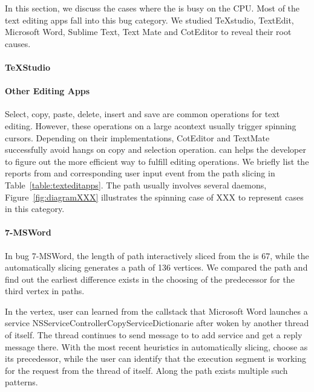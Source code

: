 In this section, we discuss the cases where the \spinningnode is busy on the
CPU. Most of the text editing apps fall into this bug category. We studied
TeXstudio, TextEdit, Microsoft Word, Sublime Text, Text Mate and CotEditor to
reveal their root causes.

\paragraph{TeXStudio}


\paragraph{Other Editing Apps}

Select, copy, paste, delete, insert and save are common operations for text
editing. However, these operations on a large acontext usually trigger spinning
cursors. Depending on their implementations, CotEditor and TextMate successfully
avoid hangs on copy and selection operation. \xxx can helps the developer to
figure out the more efficient way to fulfill editing operations. We briefly list
the reports from \spinningnode and corresponding user input event from the path
slicing in Table~\ref{table:texteditapps}. The path usually involves several
daemons, Figure~\ref{fig:diagramXXX} illustrates the spinning case of XXX to
represent cases in this category.

\paragraph{7-MSWord}

In bug 7-MSWord, the length of path interactively sliced from the \spinningnode
is 67, while the automatically slicing generates a path of 136 vertices. We
compared the path and find out the earliest difference exists in the choosing of the
predecessor for the third vertex in paths.

In the vertex, user can learned from the callstack that Microsoft Word launches
a service NSServiceControllerCopyServiceDictionarie after woken by another
thread of itself. The thread continues to send message to  to add
service and get a reply message there. With the most recent heuristics in
automatically slicing, \xxx choose  as its precedessor, while the
user can identify that the execution segment is working for the request from the
thread of itself. Along the path exists multiple such patterns.

